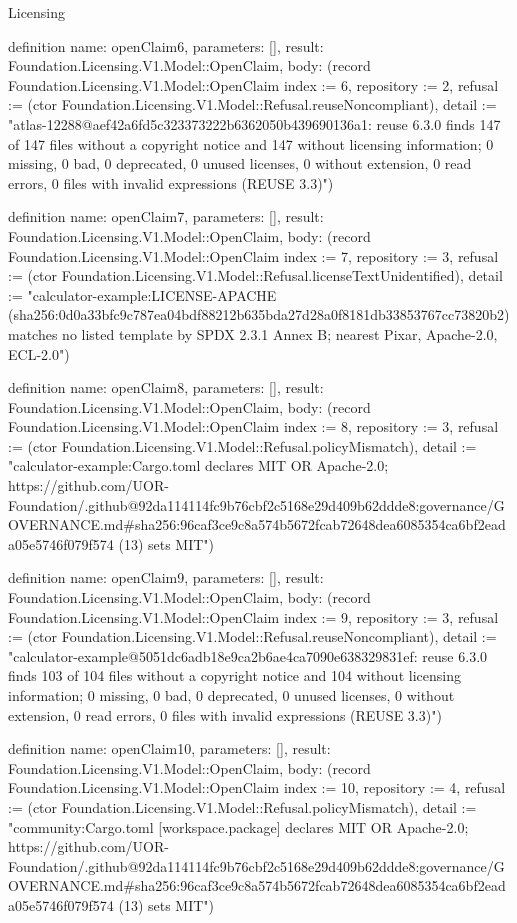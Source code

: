 \begin{lexlean}{Licensing}
\begin{semanticmodule}
definition{
  name: openClaim6,
  parameters: [],
  result: Foundation.Licensing.V1.Model::OpenClaim,
  body: (record Foundation.Licensing.V1.Model::OpenClaim {index := 6, repository := 2, refusal := (ctor Foundation.Licensing.V1.Model::Refusal.reuseNoncompliant), detail := "atlas-12288@aef42a6fd5c323373222b6362050b439690136a1: reuse 6.3.0 finds 147 of 147 files without a copyright notice and 147 without licensing information; 0 missing, 0 bad, 0 deprecated, 0 unused licenses, 0 without extension, 0 read errors, 0 files with invalid expressions (REUSE 3.3)"})
}

definition{
  name: openClaim7,
  parameters: [],
  result: Foundation.Licensing.V1.Model::OpenClaim,
  body: (record Foundation.Licensing.V1.Model::OpenClaim {index := 7, repository := 3, refusal := (ctor Foundation.Licensing.V1.Model::Refusal.licenseTextUnidentified), detail := "calculator-example:LICENSE-APACHE (sha256:0d0a33bfc9c787ea04bdf88212b635bda27d28a0f8181db33853767cc73820b2) matches no listed template by SPDX 2.3.1 Annex B; nearest Pixar, Apache-2.0, ECL-2.0"})
}

definition{
  name: openClaim8,
  parameters: [],
  result: Foundation.Licensing.V1.Model::OpenClaim,
  body: (record Foundation.Licensing.V1.Model::OpenClaim {index := 8, repository := 3, refusal := (ctor Foundation.Licensing.V1.Model::Refusal.policyMismatch), detail := "calculator-example:Cargo.toml declares MIT OR Apache-2.0; https://github.com/UOR-Foundation/.github@92da114114fc9b76cbf2c5168e29d409b62ddde8:governance/GOVERNANCE.md#sha256:96caf3ce9c8a574b5672fcab72648dea6085354ca6bf2eada05e5746f079f574 (13) sets MIT"})
}

definition{
  name: openClaim9,
  parameters: [],
  result: Foundation.Licensing.V1.Model::OpenClaim,
  body: (record Foundation.Licensing.V1.Model::OpenClaim {index := 9, repository := 3, refusal := (ctor Foundation.Licensing.V1.Model::Refusal.reuseNoncompliant), detail := "calculator-example@5051dc6adb18e9ca2b6ae4ca7090e638329831ef: reuse 6.3.0 finds 103 of 104 files without a copyright notice and 104 without licensing information; 0 missing, 0 bad, 0 deprecated, 0 unused licenses, 0 without extension, 0 read errors, 0 files with invalid expressions (REUSE 3.3)"})
}

definition{
  name: openClaim10,
  parameters: [],
  result: Foundation.Licensing.V1.Model::OpenClaim,
  body: (record Foundation.Licensing.V1.Model::OpenClaim {index := 10, repository := 4, refusal := (ctor Foundation.Licensing.V1.Model::Refusal.policyMismatch), detail := "community:Cargo.toml [workspace.package] declares MIT OR Apache-2.0; https://github.com/UOR-Foundation/.github@92da114114fc9b76cbf2c5168e29d409b62ddde8:governance/GOVERNANCE.md#sha256:96caf3ce9c8a574b5672fcab72648dea6085354ca6bf2eada05e5746f079f574 (13) sets MIT"})
}


\end{semanticmodule}
\end{lexlean}
